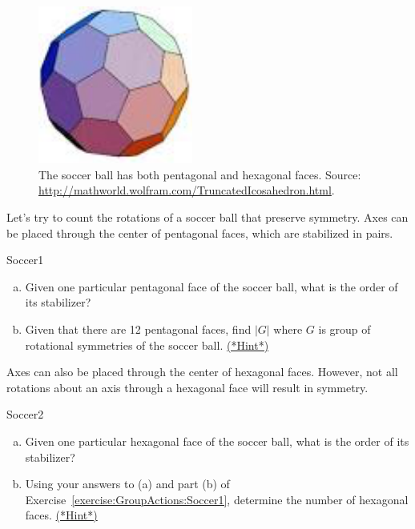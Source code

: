 \begin{figure}[ht]
\begin{center}
\includegraphics[width=2in]{images/Soccerball.png}
\caption{The soccer ball has both pentagonal and  hexagonal faces.  Source: \url{http://mathworld.wolfram.com/TruncatedIcosahedron.html}.
}
\label{fig:Soccer}
\end{center}
\end{figure}

Let's try to count the rotations of a soccer ball that preserve symmetry.  Axes can be placed through the center of pentagonal faces, which are stabilized in pairs. 

\begin{exercise}{Soccer1}
\begin{enumerate}[(a)]
\item
Given one particular pentagonal face of the soccer ball, what is the order of its stabilizer?
\item
Given that there are 12 pentagonal faces, find $|G|$ where $G$ is  group of rotational symmetries of the soccer ball.
\hyperref[sec:GroupActions:Hints]{(*Hint*)}
\end{enumerate}
\end {exercise}

 Axes can also be placed through the center of hexagonal faces.  However, not all rotations about an axis through a hexagonal face will result in symmetry.

\begin{exercise}{Soccer2}
\begin{enumerate}[(a)]
\item
Given one particular hexagonal face of the soccer ball, what is the order of its stabilizer?
\item
Using your answers to (a) and part (b) of Exercise~\ref{exercise:GroupActions:Soccer1}, determine the number of hexagonal faces. \hyperref[sec:GroupActions:Hints]{(*Hint*)}
\end{enumerate}
\end {exercise}

